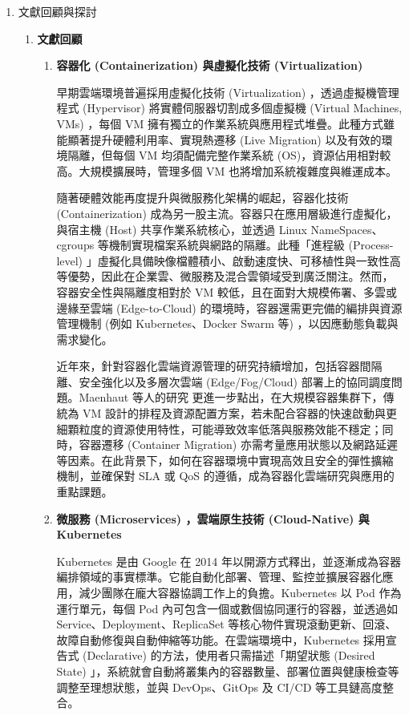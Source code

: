 \documentclass[12pt,a4paper]{article}
\begin{document}
\begin{enumerate}[label={(\zhdig*)}, leftmargin=2\parindent, listparindent=\parindent]
\begin{enumerate}[label={(\arabic*)}, leftmargin=\parindent, listparindent=\parindent]
\end{enumerate}
\item 文獻回顧與探討

\begin{enumerate}[label={(\arabic*)}, leftmargin=\parindent, listparindent=\parindent]
\item \textbf{文獻回顧}
\begin{enumerate}[label={(\zhdig*)}, leftmargin=2\parindent, listparindent=\parindent]

\item\textbf{容器化 (Containerization) \cite{9}與虛擬化技術 (Virtualization) \cite{8}}

早期雲端環境普遍採用虛擬化技術 (Virtualization) ，透過虛擬機管理程式 (Hypervisor) 將實體伺服器切割成多個虛擬機 (Virtual Machines, VMs) ，每個 VM 擁有獨立的作業系統與應用程式堆疊。此種方式雖能顯著提升硬體利用率、實現熱遷移 (Live Migration) 以及有效的環境隔離，但每個 VM 均須配備完整作業系統 (OS)，資源佔用相對較高。大規模擴展時，管理多個 VM 也將增加系統複雜度與維運成本。

隨著硬體效能再度提升與微服務化架構的崛起，容器化技術 (Containerization) 成為另一股主流。容器只在應用層級進行虛擬化，與宿主機 (Host) 共享作業系統核心，並透過 Linux NameSpaces、cgroups 等機制實現檔案系統與網路的隔離。此種「進程級 (Process-level) 」虛擬化具備映像檔體積小、啟動速度快、可移植性與一致性高等優勢，因此在企業雲、微服務及混合雲領域受到廣泛關注。然而，容器安全性與隔離度相對於 VM 較低，且在面對大規模佈署、多雲或邊緣至雲端 (Edge-to-Cloud) 的環境時，容器還需更完備的編排與資源管理機制 (例如 Kubernetes、Docker Swarm 等) ，以因應動態負載與需求變化。

近年來，針對容器化雲端資源管理的研究持續增加，包括容器間隔離、安全強化以及多層次雲端 (Edge/Fog/Cloud) 部署上的協同調度問題。Maenhaut 等人的研究\cite{20} 更進一步點出，在大規模容器集群下，傳統為 VM 設計的排程及資源配置方案，若未配合容器的快速啟動與更細顆粒度的資源使用特性，可能導致效率低落與服務效能不穩定；同時，容器遷移 (Container Migration) 亦需考量應用狀態以及網路延遲等因素。在此背景下，如何在容器環境中實現高效且安全的彈性擴縮機制，並確保對 SLA 或 QoS 的遵循，成為容器化雲端研究與應用的重點課題。

\item\textbf{
微服務 (Microservices) \cite{10}，雲端原生技術 (Cloud-Native) 與 Kubernetes
}

Kubernetes 是由 Google 在 2014 年以開源方式釋出，並逐漸成為容器編排領域的事實標準。它能自動化部署、管理、監控並擴展容器化應用，減少團隊在龐大容器協調工作上的負擔。Kubernetes 以 Pod 作為運行單元，每個 Pod 內可包含一個或數個協同運行的容器，並透過如 Service、Deployment、ReplicaSet 等核心物件實現滾動更新、回滾、故障自動修復與自動伸縮等功能。在雲端環境中，Kubernetes 採用宣告式 (Declarative) 的方法，使用者只需描述「期望狀態 (Desired State) 」，系統就會自動將叢集內的容器數量、部署位置與健康檢查等調整至理想狀態，並與 DevOps、GitOps 及 CI/CD 等工具鏈高度整合。


\end{enumerate}
\end{enumerate}
\end{enumerate}
\end{document}
